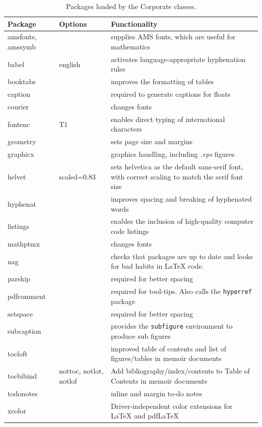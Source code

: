 \begin{table}[!h]
\centering
\caption[Packages loaded by the Corporate classes]{Packages loaded by the Corporate classes.}
\label{Tab:Packages}
\begin{tabular*}{\textwidth}{llp{}}
\toprule
Package & Options & Functionality\\
\midrule
amsfonts, amssymb & & supplies AMS fonts, which are useful for mathematics \\
babel & english & activates language-appropriate hyphenation rules\\
booktabs & & improves the formatting of tables \\
caption & & required to generate captions for floats\\
courier& & changes fonts \\
fontenc & T1 & enables direct typing of international characters \\
geometry & & sets page size and margins \\
graphicx & & graphics handling, including \emph{.eps} figures \\
helvet& scaled=0.83 & sets helvetica as the default sans-serif font, with correct scaling to match the serif font size\\
hyphenat & & improves spacing and breaking of hyphenated words \\
listings & & enables the inclusion of high-quality computer code listings\\
mathptmx& & changes fonts \\
nag & & checks that packages are up to date and looks for bad habits in LaTeX code. \\
parskip & & required for better spacing\\
pdfcomment & & required for tool-tips. Also calls the \texttt{hyperref} package  \\
setspace & & required for better spacing\\
subcaption & & provides the \texttt{subfigure} environment to produce sub figures \\
tocloft & & improved table of contents and list of figures/tables in memoir documents\\
tocbibind & nottoc, notlot, notlof & Add bibliography/index/contents to Table of Contents in memoir documents\\
todonotes & & inline and margin to-do notes \\
xcolor & & Driver-independent color extensions for LaTeX and pdfLaTeX\\
\bottomrule
\end{tabular*}
\end{table}

